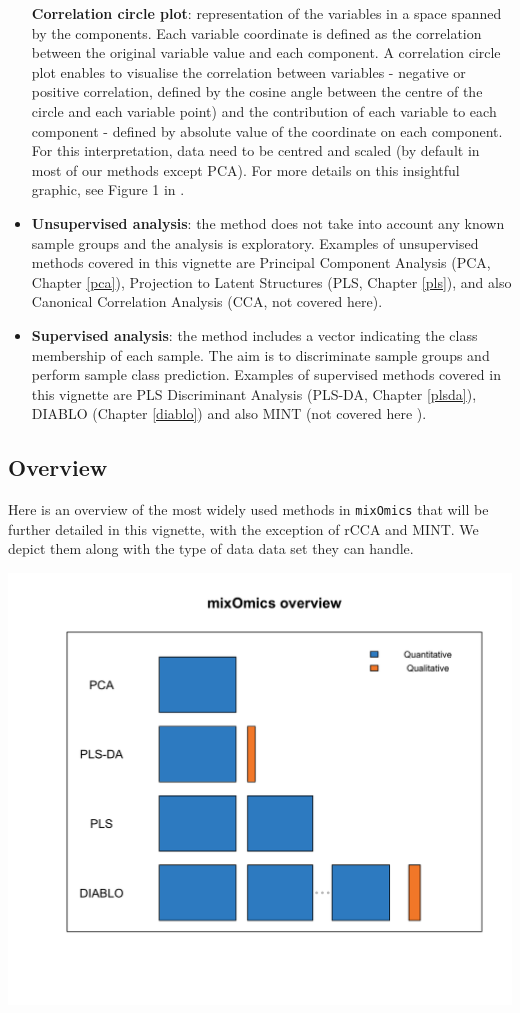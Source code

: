 \documentclass[]{book}
\theoremstyle{definition}
\theoremstyle{definition}
\theoremstyle{definition}
\theoremstyle{remark}
\begin{document}
\begin{itemize}
  \textbf{Correlation circle plot}: representation of the variables in a
  space spanned by the components. Each variable coordinate is defined
  as the correlation between the original variable value and each
  component. A correlation circle plot enables to visualise the
  correlation between variables - negative or positive correlation,
  defined by the cosine angle between the centre of the circle and each
  variable point) and the contribution of each variable to each
  component - defined by absolute value of the coordinate on each
  component. For this interpretation, data need to be centred and scaled
  (by default in most of our methods except PCA). For more details on
  this insightful graphic, see Figure 1 in \citep{Gon12}.
\item
  \textbf{Unsupervised analysis}: the method does not take into account
  any known sample groups and the analysis is exploratory. Examples of
  unsupervised methods covered in this vignette are Principal Component
  Analysis (PCA, Chapter \ref{pca}), Projection to Latent Structures
  (PLS, Chapter \ref{pls}), and also Canonical Correlation Analysis
  (CCA, not covered here).
\item
  \textbf{Supervised analysis}: the method includes a vector indicating
  the class membership of each sample. The aim is to discriminate sample
  groups and perform sample class prediction. Examples of supervised
  methods covered in this vignette are PLS Discriminant Analysis
  (PLS-DA, Chapter \ref{plsda}), DIABLO (Chapter \ref{diablo}) and also
  MINT (not covered here \citep{Roh16}).
\end{itemize}

\subsection{Overview}\label{intro:overview}

Here is an overview of the most widely used methods in \texttt{mixOmics}
that will be further detailed in this vignette, with the exception of
rCCA and MINT. We depict them along with the type of data data set they
can handle.

\begin{center}\includegraphics[width=0.5\linewidth]{Figures/overview-1} \end{center}
\end{document}
